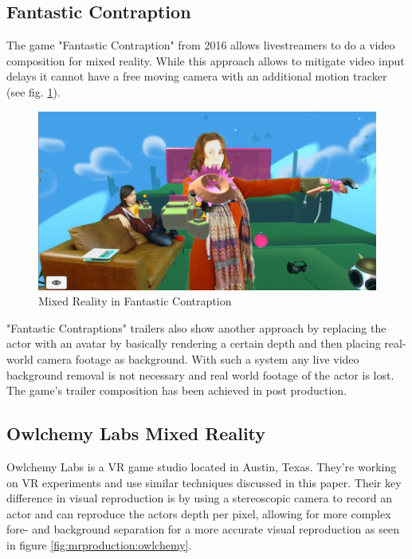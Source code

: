 \newpage
\subsection{Fantastic Contraption}

The game "Fantastic Contraption" from 2016 allows livestreamers to do a video 
composition for mixed reality. While this approach allows to mitigate video 
input delays it cannot have a free moving camera with an additional motion 
tracker (see fig. \ref{fig:mrproduction:fcontraption}).

\begin{figure}[htb]
	\centering
	\includegraphics[width=\textwidth]{_external/media/fcontraption-mr.jpg}
	\caption{Mixed Reality in Fantastic 
	Contraption\cite{northway:fcontraption:2016}}
	\label{fig:mrproduction:fcontraption}
\end{figure}

"Fantastic Contraptions" trailers also show another approach by replacing the 
actor with an avatar by basically rendering a certain depth and then placing 
real-world camera footage as background. With such a system any live video 
background removal is not necessary and real world footage of the actor is 
lost. The game's trailer composition has been achieved in post production. 
\cite{gartner:cinematography:2017}

\subsection{Owlchemy Labs Mixed Reality}

Owlchemy Labs is a VR game studio located in Austin, Texas. They're working 
on VR experiments and use similar techniques discussed in this paper. Their key 
difference in visual reproduction is by using a stereoscopic camera to record 
an actor and can reproduce the actors depth per pixel, allowing for more 
complex fore- and background separation for a more accurate visual 
reproduction as seen in figure \ref{fig:mrproduction:owlchemy}.

